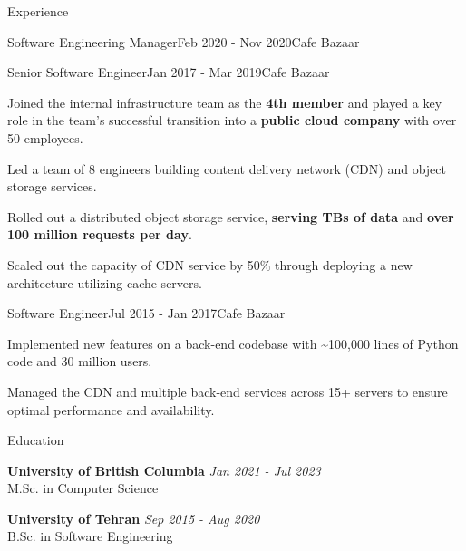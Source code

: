 \documentclass[
	10pt, %
]{resume} %
\begin{document}
\begin{rSection}{Experience}
\begin{rSubsection}{Software Engineering Manager}{Feb 2020 - Nov 2020}{Cafe Bazaar}{}
  \end{rSubsection}

  \begin{rSubsection}{Senior Software Engineer}{Jan 2017 - Mar 2019}{Cafe Bazaar}{}

    \item Joined the internal infrastructure team as the \textbf{4th member} and
      played a key role in the team's successful transition into a
      \textbf{public cloud company} with over 50 employees.

    \item Led a team of 8 engineers building content delivery network (CDN) and object storage services.

    \item Rolled out a distributed object storage service, \textbf{serving
      TBs of data} and \textbf{over 100 million requests per day}.

    \item Scaled out the capacity of CDN service by 50\% through deploying a new
      architecture utilizing cache servers.

  \end{rSubsection}

  \begin{rSubsection}{Software Engineer}{Jul 2015 - Jan 2017}{Cafe Bazaar}{}
    
    \item Implemented new features on a back-end codebase with \textasciitilde 100,000 lines
      of Python code and 30 million users.

    \item Managed the CDN and multiple back-end services across 15+ servers to
      ensure optimal performance and availability.

  \end{rSubsection}

\end{rSection}


\begin{rSection}{Education}
	
  \textbf{University of British Columbia} \hfill \textit{Jan 2021 - Jul 2023} \\ 
	M.Sc. in Computer Science

  \textbf{University of Tehran} \hfill \textit{Sep 2015 - Aug 2020} \\ 
	B.Sc. in Software Engineering
\end{rSection}
\end{document}
